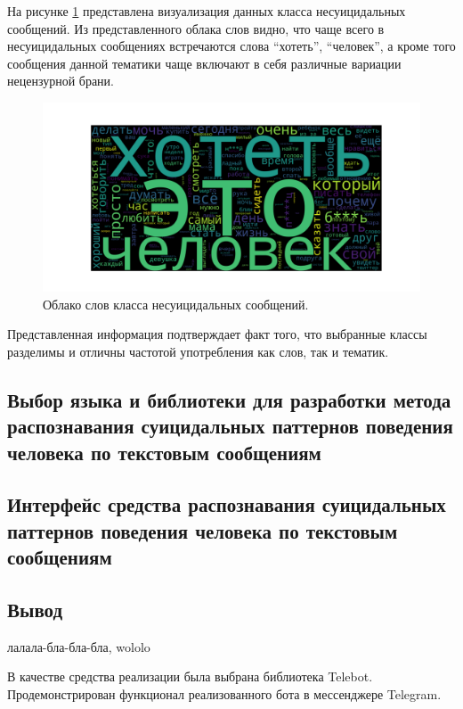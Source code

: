 На рисунке \ref{img:cloud2} представлена визуализация данных класса несуицидальных сообщений. Из представленного облака слов видно, что чаще всего в несуицидальных сообщениях встречаются слова ``хотеть'', ``человек'', а кроме того сообщения данной тематики чаще включают в себя различные вариации нецензурной брани.

\begin{figure}[H]
	\centering
	\includegraphics[width=\textwidth]{inc/cloudNonSuicidal.pdf}
	\caption{ Облако слов класса несуицидальных сообщений. }
	\label{img:cloud2}
\end{figure}

Представленная информация подтверждает факт того, что выбранные классы разделимы и отличны частотой употребления как слов, так и тематик.

\subsection{Выбор языка и библиотеки для разработки метода распознавания суицидальных паттернов поведения человека по текстовым сообщениям}

\subsection{Интерфейс средства распознавания суицидальных паттернов поведения человека по текстовым сообщениям}

\subsection*{Вывод}

лалала-бла-бла-бла, wololo

В качестве средства реализации была выбрана библиотека Telebot. Продемонстрирован функционал реализованного бота в мессенджере Telegram.